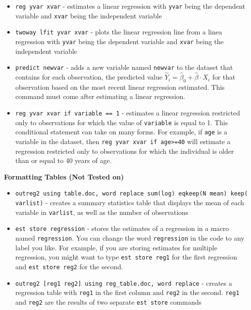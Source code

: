 \documentclass[
]{book}
\begin{document}
\begin{itemize}
\item
  \texttt{reg\ yvar\ xvar} - estimates a linear regression with \texttt{yvar} being the dependent variable and \texttt{xvar} being the independent variable
\item
  \texttt{twoway\ lfit\ yvar\ xvar} - plots the linear regression line from a linea regression with \texttt{yvar} being the dependent variable and \texttt{xvar} being the independent variable
\item
  \texttt{predict\ newvar} - adds a new variable named \texttt{newvar} to the dataset that contains for each observation, the predicted value \(\hat{Y}_i = \hat{\beta}_0 + \hat{\beta} \cdot X_i\) for that observation based on the most recent linear regression estimated. This command must come after estimating a linear regression.
\item
  \texttt{reg\ yvar\ xvar\ if\ variable\ ==\ 1} - estimates a linear regression restricted only to observations for which the value of \texttt{variable} is equal to 1. This conditional statement can take on many forms. For example, if \texttt{age} is a variable in the dataset, then \texttt{reg\ yvar\ xvar\ if\ age\textgreater{}=40} will estimate a regression restricted only to observations for which the individual is older than or equal to 40 years of age.
\end{itemize}

\textbf{Formatting Tables (Not Tested on) }

\begin{itemize}
\item
  \texttt{outreg2\ using\ table.doc,\ word\ replace\ sum(log)\ eqkeep(N\ mean)\ keep(varlist)} - creates a summary statistics table that displays the mean of each variable in \texttt{varlist}, as well as the number of observations
\item
  \texttt{est\ store\ regression} - stores the estimates of a regression in a macro named \texttt{regression}. You can change the word \texttt{regression} in the code to any label you like. For example, if you are storing estimates for multiple regression, you might want to type \texttt{est\ store\ reg1} for the first regression and \texttt{est\ store\ reg2} for the second.
\item
  \texttt{outreg2\ {[}reg1\ reg2{]}\ using\ reg\_table.doc,\ word\ replace} - creates a regression table with \texttt{reg1} in the first column and \texttt{reg2} in the second. \texttt{reg1} and \texttt{reg2} are the results of two separate \texttt{est\ store} commands
\end{itemize}
\end{document}
